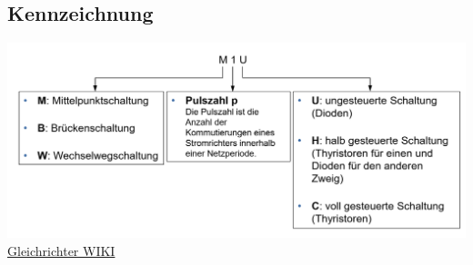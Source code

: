 \subsection{Kennzeichnung}
\includegraphics[width=\linewidth]{images/SRKennzeichnung}\newline
\href{https://de.wikipedia.org/wiki/Gleichrichter}{Gleichrichter WIKI}

\clearpage